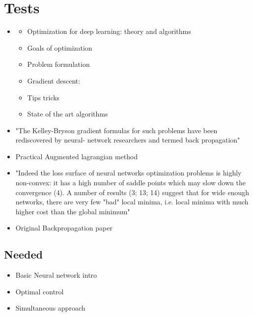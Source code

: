 \chapter{Tests}
\label{cha:3}
\begin{itemize}
\item
\cite{sun2019optimization}
\begin{itemize}
	\item Optimization for deep learning: theory and algorithms
	\item Goals of optimization
	\item Problem formulation
	\item Gradient descent:
	\item Tips  tricks
	\item State of the art algorithms
\end{itemize}


\item
\cite{dreyfus1990}

"The Kelley-Bryson gradient
formulas for such problems have been rediscovered by neural-
network researchers and termed back propagation"

\item
\cite{Birgin2009}

Practical Augmented lagrangian method

\item
\cite{jacot2020neural}
"Indeed
the loss surface of neural networks optimization problems is highly non-convex: it has a high number
of saddle points which may slow down the convergence (4). A number of results (3; 13; 14) suggest
that for wide enough networks, there are very few "bad" local minima, i.e. local minima with much
higher cost than the global minimum"
\item
\cite{Rumelhart1986}
Original Backpropagation paper


\end{itemize}

\section{Needed}

\begin{itemize}
\item
Basic Neural network intro

\item
Optimal control 

\item
Simultaneous approach
\end{itemize}



